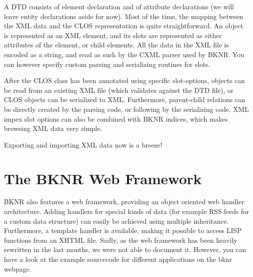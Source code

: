 A DTD consists of element declaration and of attribute declarations
(we will leave entity declarations aside for now). Most of the time,
the mapping between the XML data and the CLOS representation is quite
straightforward. An object is represented as an XML element, and its
slots are represented as either attributes of the element, or child
elements. All the data in the XML file is encoded as a string, and
read as such by the CXML parser used by BKNR. You can however specify
custom parsing and serializing routines for slots.

After the CLOS class has been annotated using specific slot-options,
objects can be read from an existing XML file (which validates against
the DTD file), or CLOS objects can be serialized to XML. Furthermore,
parent-child relations can be directly created by the parsing code, or
following by the serializing code. XML impex slot options can also be
combined with BKNR indices, which makes browsing XML data very simple.

Exporting and importing XML data now is a breeze!

\section{The BKNR Web Framework}

BKNR also features a web framework, providing an object oriented web
handler architecture. Adding handlers for special kinds of data (for
example RSS feeds for a custom data structure) can easily be achieved
using multiple inheritance. Furthermore, a template handler is
available, making it possible to access LISP functions from an XHTML
file. Sadly, as the web framework has been heavily rewritten in the
last months, we were not able to document it. However, you can have a
look at the example sourcecode for different applications on the bknr
webpage.





